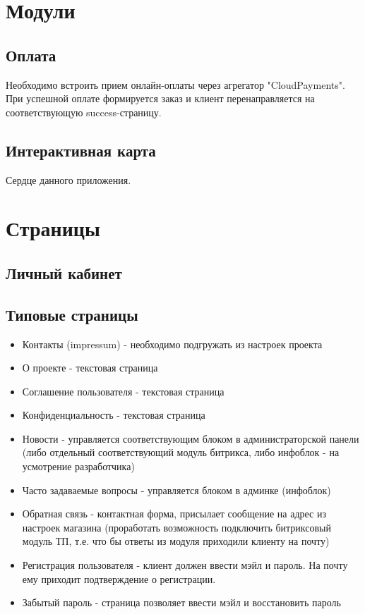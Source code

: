 \documentclass[DIV=calc, paper=a4, fontsize=11pt]{scrartcl} %
\begin{document}
\section{Модули}

\subsection{Оплата}
Необходимо встроить прием онлайн-оплаты через агрегатор "CloudPayments". При успешной оплате формируется заказ и клиент перенаправляется на соответствующую success-страницу.

\subsection{Интерактивная карта}
Сердце данного приложения.

\section{Страницы}

\subsection{Личный кабинет}


\subsection{Типовые страницы}

\begin{itemize}
	\item Контакты (impressum) - необходимо подгружать из настроек проекта
	\item О проекте - текстовая страница
	\item Соглашение пользователя - текстовая страница
	\item Конфиденциальность - текстовая страница
	\item Новости - управляется соответствующим блоком в администраторской панели (либо отдельный соответствующий модуль битрикса, либо инфоблок - на усмотрение разработчика)
	\item Часто задаваемые вопросы - управляется блоком в админке (инфоблок)
	\item Обратная связь - контактная форма, присылает сообщение на адрес из настроек магазина (проработать возможность подключить битриксовый модуль ТП, т.е. что бы ответы из модуля приходили клиенту на почту)
	\item Регистрация пользователя - клиент должен ввести мэйл и пароль. На почту ему приходит подтверждение о регистрации.
	\item Забытый пароль - страница позволяет ввести мэйл и восстановить пароль
\end{itemize}
\end{document}

